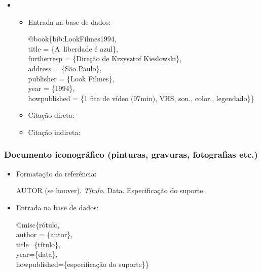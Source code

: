 \documentclass[a4paper,12pt,oneside,onecolumn]{uerj/uerj}
\newcommand{\formato}[1]{\begin{flushleft}{#1}\end{flushleft}}
\begin{document}
\begin{itemize}[label={Ex.:},leftmargin=\parindent,parsep=0pt,itemsep=0pt]
  \item     \formato{\citetext{bib:LookFilmes1994}}

  \begin{itemize}[leftmargin=*,parsep=0pt,itemsep=0pt]
    \item Entrada na base de dados:

    \formato{
      @book\{bib:LookFilmes1994,\\
      title = \{A~liberdade {\'e} azul\},\\
      furtherresp = \{Dire{\c c}{\~a}o de Krzysztof Kieslowski\},\\
      address = \{S{\~a}o Paulo\},\\
      publisher = \{Look Filmes\},\\
      year = \{1994\},\\
      howpublished = \{1 fita de vídeo (97min), VHS, son., color., legendado\}\}\\
    }

    \item Citação direta: 
    \item Citação indireta: \cite{bib:LookFilmes1994}
  \end{itemize}
\end{itemize}

\subsubsection{Documento iconográfico (pinturas, gravuras, fotografias etc.)}

\begin{itemize}[leftmargin=\parindent,parsep=0pt,itemsep=0pt]
  \item Formatação da referência:

    \formato{AUTOR (se houver). \textsl{Título}. Data. Especificação 
    do suporte.}

  \item Entrada na base de dados:

    \formato{
      @misc\{rótulo,\\
      author = \{autor\},\\
      title=\{título\},\\
      year=\{data\},\\
      howpublished=\{especificação do suporte\}\}\\
    }
\end{itemize}
\end{document}
